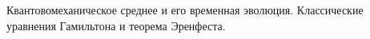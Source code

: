 \documentclass[__main__.tex]{subfiles}
\begin{document}
Квантовомеханическое среднее и его временная эволюция. Классические уравнения Гамильтона и теорема Эренфеста.\\ 

\end{document}
